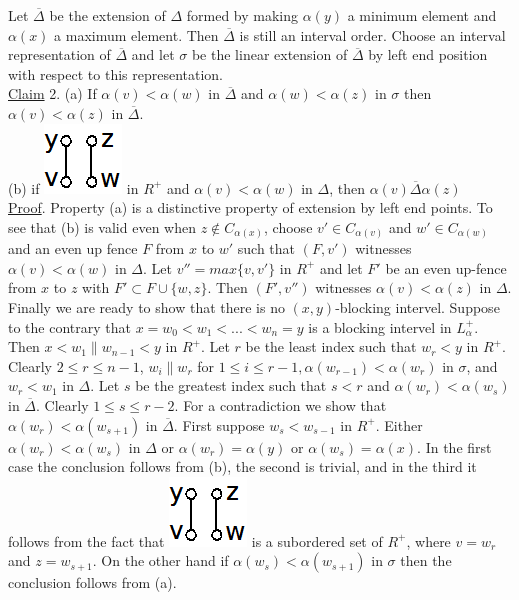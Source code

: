 \documentclass[twoside]{article}
\begin{document}
Let $\overline{\Delta}$ be the extension of $\Delta$ formed by making $\alpha (y)$ a minimum element
and $\alpha (x)$ a maximum element. Then $\overline{\Delta}$ is still an interval order. Choose an interval
representation of $\overline{\Delta}$ and let $\sigma$ be the linear extension of $\overline{\Delta}$
by left end position with respect to this representation.\\
\newline
\underline{Claim} 2. (a) If $\alpha (v) < \alpha (w)$ in $\overline{\Delta}$ and 
$\alpha (w) < \alpha (z)$ in $\sigma$ then $\alpha (v) < \alpha (z)$ in $\overline{\Delta}$.\\
(b) if \includegraphics[scale=0.25]{figures/small/small5.png} in $R^+$ and $\alpha (v) < \alpha (w)$ in $\Delta$, then $\alpha (v) \overline {\Delta} \alpha (z)$\\
\newline
\underline {Proof}. Property (a) is a distinctive property of extension by left end points. To see that (b) is valid even when 
$z \not\in C_{\alpha (x)}$, choose $v' \in C_{\alpha (v)}$ and $w' \in C_{\alpha (w)}$
and an even up fence $F$ from $x$ to $w'$ such that $(F,v')$ witnesses $\alpha (v) < \alpha (w)$
in $\Delta$. Let $v'' = max\{v,v'\}$ in $R^+$ and let $F'$ be an even up-fence from $x$ to $z$
with $F' \subset F \cup \{w,z\}$. Then $(F',v'')$ witnesses $\alpha (v) < \alpha (z)$ in $\Delta$.\\

Finally we are ready to show that there is no $(x,y)$-blocking intervel. Suppose to the contrary that
$x = w_0 < w_1<...<w_n = y$ is a blocking intervel in $L^+_{\alpha}$. Then $x<w_1\parallel w_{n-1}<y$
in $R^+$. Let $r$ be the least index such that $w_r < y$ in $R^+$. Clearly $2 \leq r\leq n-1$, $w_i \parallel w_r$
for $1 \leq i \leq r-1, \alpha (w_{r-1}) < \alpha (w_r)$ in $\sigma$, and $w_r < w_1$ in $\Delta$. Let
$s$ be the greatest index such that $s<r$ and $\alpha (w_r) < \alpha (w_s)$ in $\overline{\Delta}$.
Clearly $1\leq s\leq r-2$. For a contradiction we show that $\alpha (w_r)< \alpha(w_{s+1})$ in
$\overline{\Delta}$. First suppose $w_s < w_{s-1}$ in $R^+$. Either $\alpha (w_r) < \alpha (w_s)$
in $\Delta$  or $\alpha (w_r) = \alpha (y)$ or $\alpha (w_s) = \alpha (x)$. In the first case
the conclusion follows from (b), the second is trivial, and in the third it follows from the fact that
\includegraphics[scale=0.25]{figures/small/small5.png} is a subordered set of $R^+$, where $v= w_r$ and $z = w_{s+1}$. On the other hand if 
$\alpha (w_s) < \alpha (w_{s+1})$ in $\sigma$ then the conclusion follows from (a).\\
%
%
\end{document}
